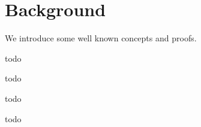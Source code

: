 \section{Background}
We introduce some well known concepts and proofs.

\begin{definition}
	\label{def:Pushdown Automata}
	todo
\end{definition}

\begin{definition}
	\label{def:Context-Free Grammar}
	todo
\end{definition}

\begin{theorem}
    \label{thm:pda-equiv}

\end{theorem}

\begin{definition}
	\label{def:Finite-State Transducer}
	todo
\end{definition}

\begin{definition}
	\label{def:Finite-State Automata}
	todo
\end{definition}


